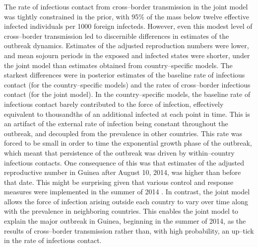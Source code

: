 The rate of infectious contact from cross--border transmission in the joint model was tightly constrained in the prior, with 95\% of the mass below twelve effective infected individuals per 1000 foreign infecteds. However, even this modest level of cross--border transmission led to discernible differences in estimates of the outbreak dynamics. Estimates of the adjusted reproduction numbers were lower, and mean sojourn periods in the exposed and infected states were shorter, under the joint model than estimates obtained from country--specific models. The starkest differences were in posterior estimates of the baseline rate of infectious contact (for the country--specific models) and the rates of cross--border infectious contact (for the joint model). In the country--specific models, the baseline rate of infectious contact barely contributed to the force of infection, effectively equivalent to thousandths of an additional infected at each point in time. This is an artifact of the external rate of infection being constant throughout the outbreak, and decoupled from the prevalence in other countries. This rate was forced to be small in order to time the exponential growth phase of the outbreak, which meant that persistence of the outbreak was driven by within--country infectious contacts. One consequence of this was that estimates of the adjusted reproductive number in Guinea after August 10, 2014, was higher than before that date. This might be surprising given that various control and response measures were implemented in the summer of 2014 \cite{coltart2017ebola}. In contrast, the joint model allows the force of infection arising outside each country to vary over time along with the prevalence in neighboring countries. This enables the joint model to explain the major outbreak in Guinea, beginning in the summer of 2014, as the results of cross--border transmission rather than, with high probability, an up--tick in the rate of infectious contact.

